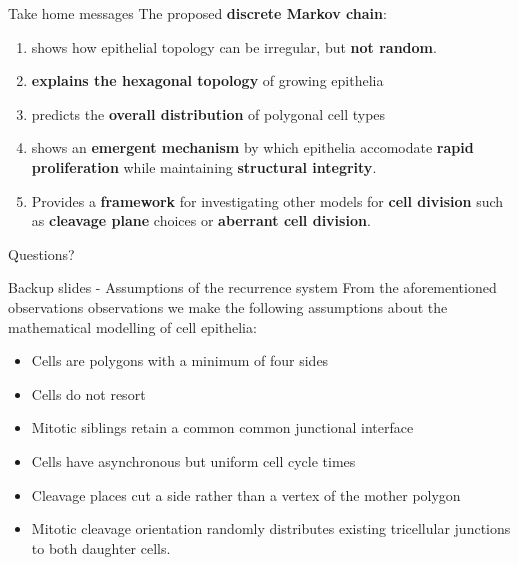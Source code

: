 \documentclass[aspectratio=169, 10pt]{beamer}
\begin{document}
\begin{frame}[fragile]{Take home messages} 
  The proposed \textbf{discrete Markov chain}:
  \begin{enumerate}
    \item shows how epithelial topology can be irregular, but \textbf{not random}.
    \item \textbf{explains the hexagonal topology} of growing epithelia
    \item predicts the \textbf{overall distribution} of polygonal cell types
    \item shows an \textbf{emergent mechanism} by which epithelia accomodate \textbf{rapid proliferation} while maintaining \textbf{structural integrity}. 
    \item Provides a \textbf{framework} for investigating other models for \textbf{cell division} such as \textbf{cleavage plane} choices or \textbf{aberrant cell division}.
  \end{enumerate}
\end{frame}

\begin{frame}[standout]
  Questions?
\end{frame}

\appendix

\begin{frame}[fragile]{Backup slides - Assumptions of the recurrence system}
  From the aforementioned observations observations we make the following assumptions about the mathematical modelling of cell epithelia: 
  \begin{itemize}
    \item Cells are polygons with a minimum of four sides
    \item Cells do not resort
    \item Mitotic siblings retain a common common junctional interface
    \item Cells have asynchronous but uniform cell cycle times
    \item Cleavage places cut a side rather than a vertex of the mother polygon
    \item Mitotic cleavage orientation randomly distributes existing tricellular junctions to both daughter cells.
  \end{itemize} 
\end{frame}
\end{document}
